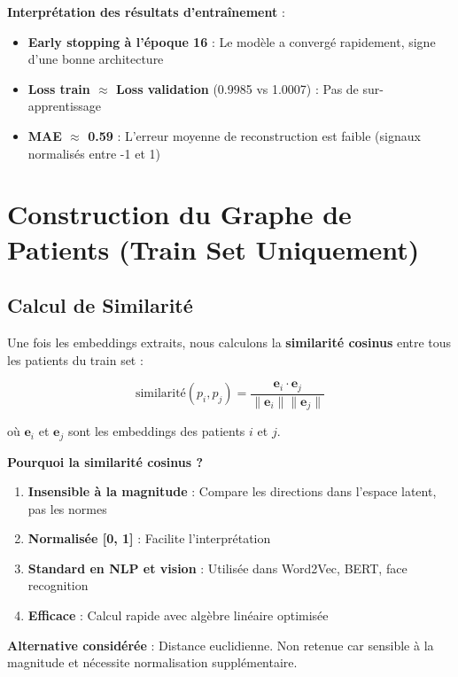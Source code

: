 \documentclass[12pt,a4paper]{article}
\begin{document}
\textbf{Interprétation des résultats d'entraînement} :

\begin{itemize}
    \item \textbf{Early stopping à l'époque 16} : Le modèle a convergé rapidement, signe d'une bonne architecture
    \item \textbf{Loss train $\approx$ Loss validation} (0.9985 vs 1.0007) : Pas de sur-apprentissage
    \item \textbf{MAE $\approx$ 0.59} : L'erreur moyenne de reconstruction est faible (signaux normalisés entre -1 et 1)
\end{itemize}

\section{Construction du Graphe de Patients (Train Set Uniquement)}

\subsection{Calcul de Similarité}

Une fois les embeddings extraits, nous calculons la \textbf{similarité cosinus} entre tous les patients du train set :

\begin{equation}
\text{similarité}(p_i, p_j) = \frac{\mathbf{e}_i \cdot \mathbf{e}_j}{\|\mathbf{e}_i\| \|\mathbf{e}_j\|}
\end{equation}

où $\mathbf{e}_i$ et $\mathbf{e}_j$ sont les embeddings des patients $i$ et $j$.

\textbf{Pourquoi la similarité cosinus ?}

\begin{enumerate}
    \item \textbf{Insensible à la magnitude} : Compare les directions dans l'espace latent, pas les normes
    \item \textbf{Normalisée [0, 1]} : Facilite l'interprétation
    \item \textbf{Standard en NLP et vision} : Utilisée dans Word2Vec, BERT, face recognition
    \item \textbf{Efficace} : Calcul rapide avec algèbre linéaire optimisée
\end{enumerate}

\textbf{Alternative considérée} : Distance euclidienne. Non retenue car sensible à la magnitude et nécessite normalisation supplémentaire.
\end{document}
